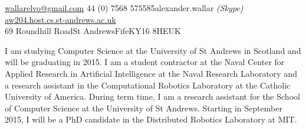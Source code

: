 \documentclass[10pt,a4paper]{article} %
\begin{document}


\noindent\href{mailto:wallarelvo@gmail.com}{wallarelvo@gmail.com}\bull %
\textsmaller{+}44 (0) 7568 575585\bull alexander.wallar \textit{(Skype)}\bull %
\href{http://aw204.host.cs.st-andrews.ac.uk}{aw204.host.cs.st-andrews.ac.uk}\\ %
69 Roundhill Road\bull St Andrews\bull Fife\bull KY16 8HE\bull UK %

\spacedhrule{0.9em}{-0.4em} %



\vspace{-1.3em} %

\begin{multicols}{2}  %

I am studying Computer Science at the University of St
Andrews in Scotland and will be graduating in 2015. I am a student contractor at the Naval Center for Applied Research in Artificial Intelligence at the Naval Research Laboratory and a research assistant in
the Computational Robotics Laboratory at the Catholic University of America. During term time, I am a research assistant for the School of
Computer Science at the University of St Andrews. Starting in September 2015, I will be a PhD candidate in the Distributed Robotics Laboratory at MIT.

\end{multicols}

\spacedhrule{0.5em}{-0.4em} %

\end{document}
